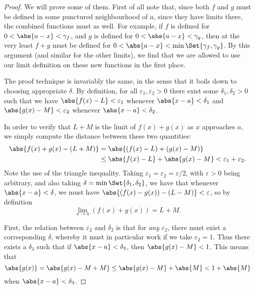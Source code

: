 \begin{proof}
	We will prove some of them. First of all note that, since both $f$ and $g$ must be defined in some punctured neighbourhood of $a$, since they have limits there, the combined functions must as well. For example, if $f$ is defined for $0 < \abs{a - x} < \gamma_f$, and $g$ is defined for $0 < \abs{a - x} < \gamma_g$, then at the very least $f + g$ must be defined for $0 < \abs{a - x} < \min\Set{\gamma_f, \gamma_g}$. By this argument (and similar for the other limits), we find that we are allowed to use our limit definition on these new functions in the first place.

	The proof technique is invariably the same, in the sense that it boils down to choosing appropriate $\delta$. By definition, for all $\varepsilon_1, \varepsilon_2 > 0$ there exist some $\delta_1, \delta_2 > 0$ such that we have $\abs{f(x) - L} < \varepsilon_1$ whenever $\abs{x - a} < \delta_1$ and $\abs{g(x) - M} < \varepsilon_2$ whenever $\abs{x - a} < \delta_2$.

	 In order to verify that $L + M$ is the limit of $f(x) + g(x)$ as $x$ approaches $a$, we simply compute the distance between these two quantities:
	\begin{align*}
		\abs{f(x) + g(x) - (L + M)} & = \abs{(f(x) - L) + (g(x) - M)}                                       \\
		                            & \leq \abs{f(x) - L} + \abs{g(x) - M} < \varepsilon_1 + \varepsilon_2.
	\end{align*}
	Note the use of the triangle inequality. Taking $\varepsilon_1 = \varepsilon_2 = \varepsilon / 2$, with $\varepsilon > 0$ being arbitrary, and also taking $\delta = \min\Set{\delta_1, \delta_2}$, we have that whenever $\abs{x - a} < \delta$, we must have $\abs{(f(x) - g(x)) - (L - M)} < \varepsilon$, so by definition
	\[
		\lim_{x \to a} (f(x) + g(x)) = L + M.
	\]

	 First, the relation between $\varepsilon_2$ and $\delta_2$ is that for \emph{any} $\varepsilon_2$, there must exist a corresponding $\delta$, whereby it must in particular work if we take $\varepsilon_2 = 1$. Thus there exists a $\delta_3$ such that if $\abs{x - a} < \delta_3$, then $\abs{g(x) - M} < 1$. This means that
	\[
		\abs{g(x)} = \abs{g(x) - M + M} \leq \abs{g(x) - M} + \abs{M} < 1 + \abs{M}
	\]
	when $\abs{x - a} < \delta_3$.


\end{proof}
